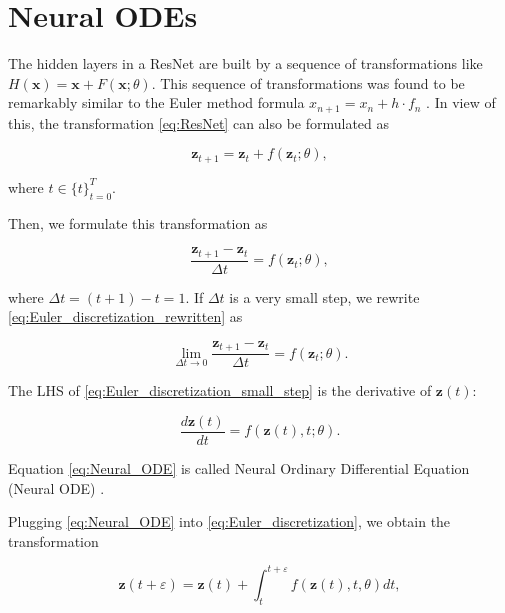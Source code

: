 \documentclass[
	parskip, 			   %
	twoside, 			   %
	DIV=14, 			   %
	BCOR=15.0mm, 		   %
	headsepline, 		   %
	open=right, 		   %
	captions=tableheading, %
	bibliography=totoc,    %
	numbers=noenddot       %
]{scrreprt}
\begin{document}
\section{Neural ODEs}
The hidden layers in a ResNet are built by a sequence of transformations like $H(\mathbf{x})=\mathbf{x}+F(\mathbf{x};\theta)$. This sequence of transformations was found to be remarkably similar to the Euler method formula $x_{n+1} = x_{n} + h \cdot f_{n}$ \cite{ruthotto2020deep}. In view of this, the transformation \ref{eq:ResNet} can also be formulated as

\begin{equation}
    \label{eq:Euler_discretization}
    \mathbf{z}_{t+1} = \mathbf{z}_{t} + f(\mathbf{z}_{t}; \theta),
\end{equation}

where $t \in \{t\}_{t=0}^T$.

Then, we formulate this transformation as 

\begin{equation}
    \label{eq:Euler_discretization_rewritten}
    \frac{\mathbf{z}_{t+1}-\mathbf{z}_{t}}{\Delta t} = f(\mathbf{z}_{t}; \theta),
\end{equation}

where $\Delta t = (t+1)-t = 1$. If $\Delta t$ is a very small step, we rewrite \ref{eq:Euler_discretization_rewritten} as

\begin{equation}
    \label{eq:Euler_discretization_small_step}
    \lim_{\Delta t \to 0} \frac{\mathbf{z}_{t+1}-\mathbf{z}_{t}}{\Delta t} = f(\mathbf{z}_{t}; \theta).
\end{equation}

The LHS of \ref{eq:Euler_discretization_small_step} is the derivative of $\mathbf{z}(t)$:

\begin{equation}
    \label{eq:Neural_ODE}
    \frac{d\mathbf{z}(t)}{dt} = f(\mathbf{z}(t), t; \theta).
\end{equation}

Equation \ref{eq:Neural_ODE} is called Neural Ordinary Differential Equation (Neural ODE) \cite{chen2018neural}.

Plugging \ref{eq:Neural_ODE} into \ref{eq:Euler_discretization}, we obtain the transformation 

\begin{equation}
    \label{eq:Euler_transformation_NeuralODE}
    \mathbf{z}(t+\varepsilon ) = \mathbf{z}(t) + \int_{t}^{t+\varepsilon } f(\mathbf{z}(t), t, \theta)dt,
\end{equation}
\end{document}
